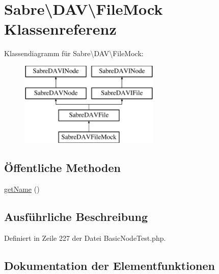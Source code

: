 \hypertarget{class_sabre_1_1_d_a_v_1_1_file_mock}{}\section{Sabre\textbackslash{}D\+AV\textbackslash{}File\+Mock Klassenreferenz}
\label{class_sabre_1_1_d_a_v_1_1_file_mock}
Klassendiagramm für Sabre\textbackslash{}D\+AV\textbackslash{}File\+Mock\+:\begin{figure}[H]
\begin{center}
\leavevmode
\includegraphics[height=4.000000cm]{class_sabre_1_1_d_a_v_1_1_file_mock}
\end{center}
\end{figure}
\subsection*{Öffentliche Methoden}
\begin{DoxyCompactItemize}
\item 
\mbox{\hyperlink{class_sabre_1_1_d_a_v_1_1_file_mock_a63ef619b943fbd2f3669aa0406763f00}{get\+Name}} ()
\end{DoxyCompactItemize}


\subsection{Ausführliche Beschreibung}


Definiert in Zeile 227 der Datei Basic\+Node\+Test.\+php.



\subsection{Dokumentation der Elementfunktionen}
\mbox{\label{class_sabre_1_1_d_a_v_1_1_file_mock_a63ef619b943fbd2f3669aa0406763f00}} 
